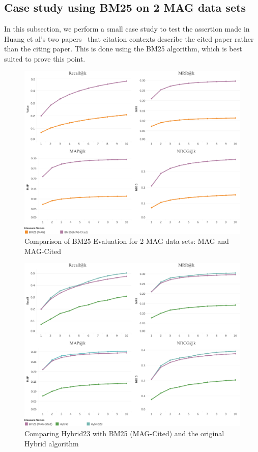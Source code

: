 \subsection{Case study using BM25 on 2 MAG data sets}
In this subsection, we perform a small case study to test the assertion made in Huang et al's two papers~\cite{HuangKCMGR12,Huang2015} that citation contexts describe the cited paper rather than the citing paper. This is done using the BM25 algorithm, which is best suited to prove this point.
\begin{figure}[h]
    \centering
    \includegraphics[keepaspectratio, width=.9\linewidth]{figures/Evaluation/MagCitedMetricGraphs.pdf}
    \caption{Comparison of BM25 Evaluation for 2 MAG data sets: MAG and MAG-Cited}
    \label{fig:magcitedevaluation}
\end{figure}
\begin{figure}
    \centering
    \includegraphics[keepaspectratio, width=.9\linewidth]{figures/Evaluation/MAGHybridv2metrics.pdf}
    \caption{Comparing Hybrid23 with BM25 (MAG-Cited) and the original Hybrid algorithm}
    \label{fig:maghybridevaluation}
\end{figure}
